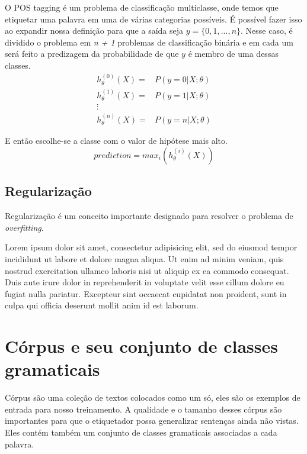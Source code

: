 O POS tagging é um problema de classificação multiclasse, onde temos que etiquetar uma palavra em uma de várias categorias possíveis. É possível fazer isso ao expandir nossa definição para que a saída seja $y = \{0, 1, ..., n\}$. Nesse caso, é dividido o problema em \textit{n + 1} problemas de classificação binária e em cada um será feito a predizagem da probabilidade de que $y$ é membro de uma dessas classes.
\begin{align}
h_{\theta}^{(0)}(X) =&  P(y=0 | X ; \theta) \nonumber \\
h_{\theta}^{(1)}(X) =&  P(y=1 | X ; \theta) \nonumber \\
\vdots & \nonumber \\
h_{\theta}^{(n)}(X) =&  P(y=n | X ; \theta) \nonumber
\end{align}

E então escolhe-se a classe com o valor de hipótese mais alto.
\begin{equation}
prediction = max_i(h_{\theta}^{(i)}(X)) \nonumber
\end{equation}


\subsection{Regularização}

Regularização é um conceito importante designado para resolver o problema de \textit{overfitting}.

Lorem ipsum dolor sit amet, consectetur adipisicing elit, sed do eiusmod
tempor incididunt ut labore et dolore magna aliqua. Ut enim ad minim veniam,
quis nostrud exercitation ullamco laboris nisi ut aliquip ex ea commodo
consequat. Duis aute irure dolor in reprehenderit in voluptate velit esse
cillum dolore eu fugiat nulla pariatur. Excepteur sint occaecat cupidatat non
proident, sunt in culpa qui officia deserunt mollit anim id est laborum.



\section{Córpus e seu conjunto de classes gramaticais}

Córpus são uma coleção de textos colocados como um só, eles são os exemplos de entrada para nosso treinamento. A qualidade e o tamanho desses córpus são importantes para que o etiquetador possa generalizar sentenças ainda não vistas. Eles contém também um conjunto de classes gramaticais associadas a cada palavra.

